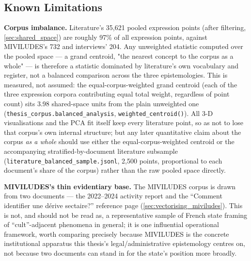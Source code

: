 \subsection{Known Limitations}\label{sec:known_limitations}

\textbf{Corpus imbalance.} Literature's 35{,}621 pooled expression points (after filtering, \ref{sec:shared_space}) are roughly 97\% of all expression points, against MIVILUDES's 732 and interviews' 204. Any unweighted statistic computed over the pooled space — a grand centroid, "the nearest concept to the corpus as a whole" — is therefore a statistic dominated by literature's own vocabulary and register, not a balanced comparison across the three epistemologies. This is measured, not assumed: the equal-corpus-weighted grand centroid (each of the three expression corpora contributing equal total weight, regardless of point count) sits 3.98 shared-space units from the plain unweighted one (\texttt{thesis\_corpus.balanced\_analysis}, \texttt{weighted\_centroid()}). All 3-D visualisations and the PCA fit itself keep every literature point, so as not to lose that corpus's own internal structure; but any later quantitative claim about the corpus \textit{as a whole} should use either the equal-corpus-weighted centroid or the accompanying stratified-by-document literature subsample (\texttt{literature\_balanced\_sample.jsonl}, 2{,}500 points, proportional to each document's share of the corpus) rather than the raw pooled space directly.

\textbf{MIVILUDES's thin evidentiary base.} The MIVILUDES corpus is drawn from two documents — the 2022–2024 activity report and the \enquote{Comment identifier une dérive sectaire?} reference page (\ref{sec:vectorising_miviludes}). This is not, and should not be read as, a representative sample of French state framing of \enquote{cult}-adjacent phenomena in general; it is one influential operational framework, worth comparing precisely because MIVILUDES is the concrete institutional apparatus this thesis's legal/administrative epistemology centres on, not because two documents can stand in for the state's position more broadly.

